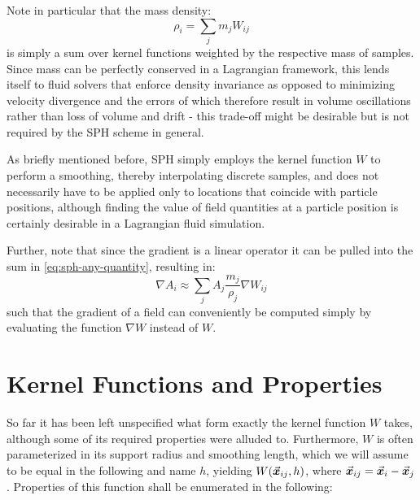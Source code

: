 Note in particular that the mass density:
\begin{equation}\label{eq:density-sph}
  \rho_i = \sum_j m_j W_{ij}
\end{equation} is simply a sum over kernel functions weighted by the respective mass of samples\autocite*{tutorial}. Since mass can be perfectly conserved in a Lagrangian framework, this lends itself to fluid solvers that enforce density invariance as opposed to minimizing velocity divergence and the errors of which therefore result in volume oscillations rather than loss of volume and drift - this trade-off might be desirable but is not required by the SPH scheme in general.

As briefly mentioned before, SPH simply employs the kernel function $W$ to perform a smoothing, thereby interpolating discrete samples, and does not necessarily have to be applied only to locations that coincide with particle positions, although finding the value of field quantities at a particle position is certainly desirable in a Lagrangian fluid simulation.

Further, note that since the gradient is a linear operator it can be pulled into the sum in \autoref{eq:sph-any-quantity}, resulting in\autocite*{tutorial}:
\begin{equation}\label{eq:sph-nabla-any-quantity}
  \nabla A_i \approx \sum_j A_j \frac{m_j}{\rho_j} \nabla W_{ij}
\end{equation}
such that the gradient of a field can conveniently be computed simply by evaluating the function $\nabla W$ instead of $W$.

\newpage
\section{Kernel Functions and Properties}

So far it has been left unspecified what form exactly the kernel function $W$ takes, although some of its required properties were alluded to. Furthermore, $W$ is often parameterized in its support radius and smoothing length, which we will assume to be equal in the following and name $h$, yielding $W(\vec{\bm{x}}_{ij}, h)$, where $\vec{\bm{x}}_{ij} = \vec{\bm{x}}_i-\vec{\bm{x}}_j$. Properties of this function shall be enumerated in the following\autocite*{tutorial}:

